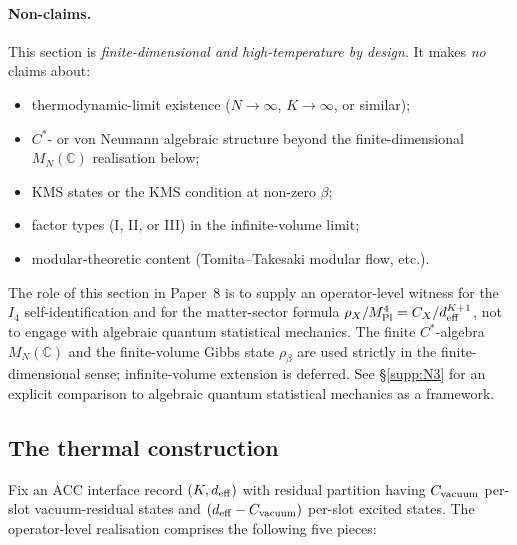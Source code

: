 \documentclass[11pt]{article}
\theoremstyle{plain}
\theoremstyle{definition}
\theoremstyle{remark}
\newcommand{\Mpl}{M_{\rm Pl}}
\begin{document}
\paragraph{Non-claims.}  This section is \emph{finite-dimensional and high-temperature by design}.  It makes \emph{no} claims about:
\begin{itemize}[leftmargin=2em,itemsep=2pt]
  \item thermodynamic-limit existence ($N \to \infty$, $K \to \infty$, or similar);
  \item $C^*$- or von Neumann algebraic structure beyond the finite-dimensional $M_N(\mathbb{C})$ realisation below;
  \item KMS states or the KMS condition at non-zero $\beta$;
  \item factor types (I, II, or III) in the infinite-volume limit;
  \item modular-theoretic content (Tomita--Takesaki modular flow, etc.).
\end{itemize}
The role of this section in Paper~8 is to supply an operator-level witness for the $I_4$ self-identification and for the matter-sector formula $\rho_X / \Mpl^4 = C_X / d_{\rm eff}^{K+1}$, not to engage with algebraic quantum statistical mechanics.  The finite $C^*$-algebra $M_N(\mathbb{C})$ and the finite-volume Gibbs state $\rho_\beta$ are used strictly in the finite-dimensional sense; infinite-volume extension is deferred.  See \S\ref{supp:N3} for an explicit comparison to algebraic quantum statistical mechanics as a framework.

\bigskip

\subsection{The thermal construction}\label{supp:H1}

Fix an ACC interface record $(K, d_{\rm eff})$ with residual partition having $C_{\rm vacuum}$ per-slot vacuum-residual states and $(d_{\rm eff} - C_{\rm vacuum})$ per-slot excited states.  The operator-level realisation comprises the following five pieces:
\end{document}
